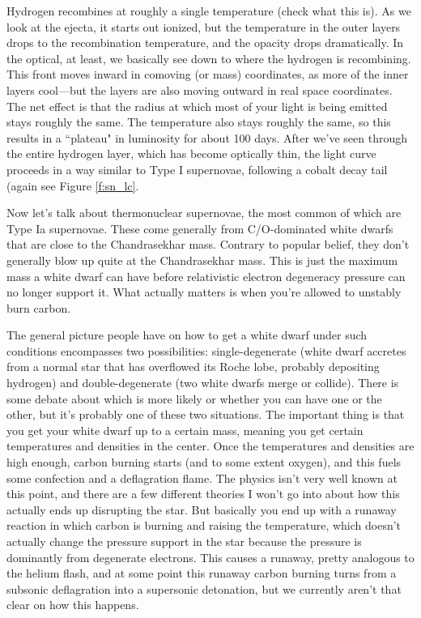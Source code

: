 Hydrogen recombines at roughly a single temperature (check what this is). As we look at the ejecta, it starts out ionized, but the temperature in the outer layers drops to the recombination temperature, and the opacity drops dramatically. In the optical, at least, we basically see down to where the hydrogen is recombining. This front moves inward in comoving (or mass) coordinates, as more of the inner layers cool---but the layers are also moving outward in real space coordinates. The net effect is that the radius at which most of your light is being emitted stays roughly the same. The temperature also stays roughly the same, so this results in a ``plateau" in luminosity for about 100 days. After we've seen through the entire hydrogen layer, which has become optically thin, the light curve proceeds in a way similar to Type I supernovae, following a cobalt decay tail (again see Figure \ref{f:sn_lc}.

Now let's talk about thermonuclear supernovae, the most common of which are Type Ia supernovae. These come generally from C/O-dominated white dwarfs that are close to the Chandrasekhar mass. Contrary to popular belief, they don't generally blow up quite at the Chandrasekhar mass. This is just the maximum mass a white dwarf can have before relativistic electron degeneracy pressure can no longer support it. What actually matters is when you're allowed to unstably burn carbon. 

The general picture people have on how to get a white dwarf under such conditions encompasses two possibilities: single-degenerate (white dwarf accretes from a normal star that has overflowed its Roche lobe, probably depositing hydrogen) and double-degenerate (two white dwarfs merge or collide). There is some debate about which is more likely or whether you can have one or the other, but it's probably one of these two situations. The important thing is that you get your white dwarf up to a certain mass, meaning you get certain temperatures and densities in the center. Once the temperatures and densities are high enough, carbon burning starts (and to some extent oxygen), and this fuels some confection and a deflagration flame. The physics isn't very well known at this point, and there are a few different theories I won't go into about how this actually ends up disrupting the star. But basically you end up with a runaway reaction in which carbon is burning and raising the temperature, which doesn't actually change the pressure support in the star because the pressure is dominantly from degenerate electrons. This causes a runaway, pretty analogous to the helium flash, and at some point this runaway carbon burning turns from a subsonic deflagration into a supersonic detonation, but we currently aren't that clear on how this happens.

